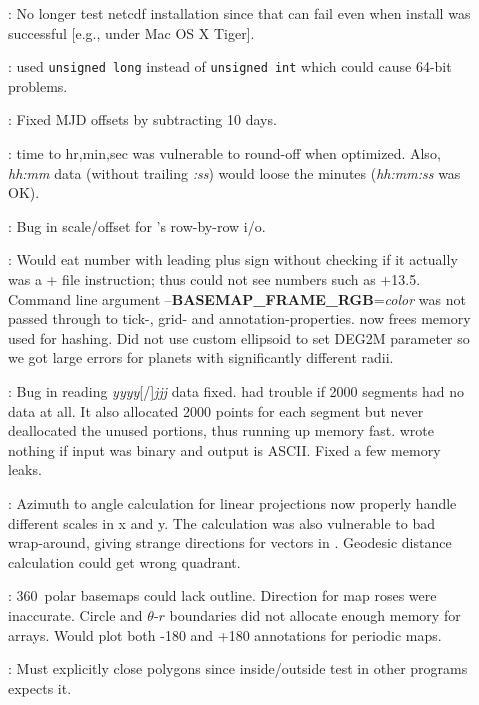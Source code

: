 \begin{description}
\item []: No longer test netcdf installation since that can fail even when install was
successful [e.g., under Mac OS X Tiger].
\item []:  used {\tt unsigned long} instead of {\tt unsigned int} which could cause
64-bit problems.
\item []: Fixed MJD offsets by subtracting 10 days.
\item []: time to hr,min,sec was vulnerable to round-off when optimized.  Also, \emph{hh:mm} data
(without trailing \emph{:ss}) would loose the minutes (\emph{hh:mm:ss} was OK).
\item []: Bug in scale/offset for 's row-by-row i/o.
\item []: Would eat number with leading plus sign without checking if it actually was
a + file instruction; thus  could not see numbers such as +13.5.
Command line argument --\textbf{BASEMAP\_FRAME\_RGB}=\emph{color} was not passed through to tick-, grid- and
annotation-properties.   now frees memory used for hashing.  Did not use custom ellipsoid to set
DEG2M parameter so we got large errors for planets with significantly different radii.
\item []: Bug in reading \emph{yyyy}[/]\emph{jjj} data fixed.  
had trouble if 2000 segments had no data at all.  It also allocated 2000 points for each segment but never
deallocated the unused portions, thus running up memory fast.   wrote nothing
if input was binary and output is ASCII.  Fixed a few memory leaks.
\item []: Azimuth to angle calculation for linear projections now properly handle different
scales in x and y. The calculation was also vulnerable to bad wrap-around, giving strange directions for
vectors in . Geodesic distance calculation could get wrong quadrant.  
\item []: 360\DS\ polar basemaps could lack outline.  Direction for map roses were inaccurate.
Circle and $\theta$-$r$ boundaries did not allocate enough memory for arrays.  Would plot both -180 and +180 annotations
for periodic maps.
\item []: Must explicitly close polygons since inside/outside test in other programs expects it.

\end{description}
